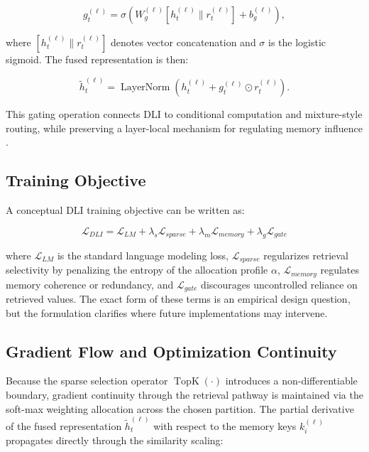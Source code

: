 \begin{equation}
g_t^{(\ell)} = \sigma\left(W_g^{(\ell)}[h_t^{(\ell)} \parallel r_t^{(\ell)}] + b_g^{(\ell)}\right),
\end{equation}

where $[h_t^{(\ell)} \parallel r_t^{(\ell)}]$ denotes vector concatenation and $\sigma$ is the logistic sigmoid. The fused representation is then:

\begin{equation}
\tilde{h}_t^{(\ell)} = \operatorname{LayerNorm}\left(h_t^{(\ell)} + g_t^{(\ell)} \odot r_t^{(\ell)}\right).
\end{equation}

This gating operation connects DLI to conditional computation and mixture-style routing, while preserving a layer-local mechanism for regulating memory influence \cite{Lepikhin2020,Bulatov2022}.

\subsection{Training Objective}
A conceptual DLI training objective can be written as:

\begin{equation}
\mathcal{L}_{DLI} = \mathcal{L}_{LM} + \lambda_s \mathcal{L}_{sparse} + \lambda_m \mathcal{L}_{memory} + \lambda_g \mathcal{L}_{gate}
\end{equation}

where $\mathcal{L}_{LM}$ is the standard language modeling loss, $\mathcal{L}_{sparse}$ regularizes retrieval selectivity by penalizing the entropy of the allocation profile $\alpha$, $\mathcal{L}_{memory}$ regulates memory coherence or redundancy, and $\mathcal{L}_{gate}$ discourages uncontrolled reliance on retrieved values. The exact form of these terms is an empirical design question, but the formulation clarifies where future implementations may intervene.

\subsection{Gradient Flow and Optimization Continuity}
Because the sparse selection operator $\operatorname{TopK}(\cdot)$ introduces a non-differentiable boundary, gradient continuity through the retrieval pathway is maintained via the soft-max weighting allocation across the chosen partition. The partial derivative of the fused representation $\tilde{h}_t^{(\ell)}$ with respect to the memory keys $k_i^{(\ell)}$ propagates directly through the similarity scaling:

